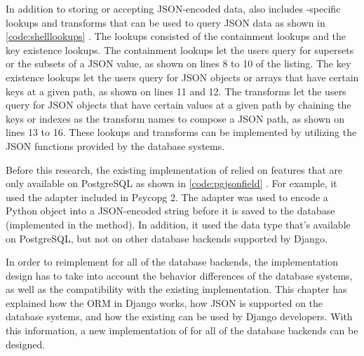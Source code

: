 \noindent
\begin{minipage}{\linewidth}

\end{minipage}

In addition to storing or accepting JSON-encoded data,  also
includes -specific lookups and transforms that can be used to
query JSON data as shown in \autoref{code:shelllookups}
\cite{django30_modeljsonfield}. The lookups consisted of the containment
lookups and the key existence lookups. The containment lookups let the users
query for supersets or the subsets of a JSON value, as shown on lines 8 to 10
of the listing. The key existence lookups let the users query for JSON objects
or arrays that have certain keys at a given path, as shown on lines 11 and 12.
The transforms let the users query for JSON objects that have certain values at
a given path by chaining the keys or indexes as the transform names to compose
a JSON path, as shown on lines 13 to 16. These lookups and transforms can be
implemented by utilizing the JSON functions provided by the database systems.

\noindent
\begin{minipage}{\linewidth}

\end{minipage}

Before this research, the existing implementation of  relied on
features that are only available on PostgreSQL as shown in
\autoref{code:pgjsonfield} \cite{django:pgjsonfield}. For example, it used the
 adapter included in Psycopg 2. The adapter was used to encode a
Python object into a JSON-encoded string before it is saved to the database
(implemented in the  method). In addition, it used the
 data type that's available on PostgreSQL, but not on other
database backends supported by Django.

In order to reimplement  for all of the database backends, the
implementation design has to take into account the behavior differences of the
database systems, as well as the compatibility with the existing
implementation. This chapter has explained how the ORM in Django works, how
JSON is supported on the database systems, and how the existing
 can be used by Django developers. With this information, a new
implementation of  for all of the database backends can be
designed.
